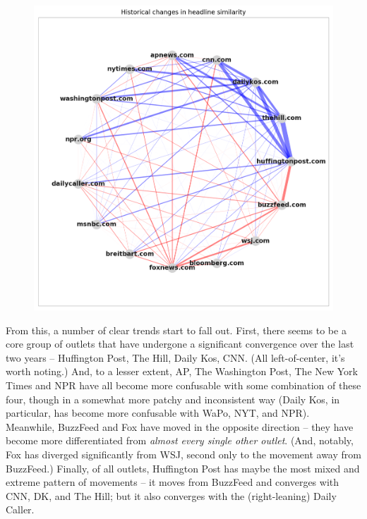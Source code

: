 \documentclass{scrartcl}
\begin{document}
\begin{figure}[H]
  \centering
  \includegraphics[height=0.5\textheight]{figures/ts-ab-radial.png}
\end{figure}

From this, a number of clear trends start to fall out. First, there seems to be a core group of outlets that have undergone a significant convergence over the last two years -- Huffington Post, The Hill, Daily Kos, CNN. (All left-of-center, it's worth noting.) And, to a lesser extent, AP, The Washington Post, The New York Times and NPR have all become more confusable with some combination of these four, though in a somewhat more patchy and inconsistent way (Daily Kos, in particular, has become more confusable with WaPo, NYT, and NPR). Meanwhile, BuzzFeed and Fox have moved in the opposite direction -- they have become more differentiated from \textit{almost every single other outlet}. (And, notably, Fox has diverged significantly from WSJ, second only to the movement away from BuzzFeed.) Finally, of all outlets, Huffington Post has maybe the most mixed and extreme pattern of movements -- it moves from BuzzFeed and converges with CNN, DK, and The Hill; but it also converges with the (right-leaning) Daily Caller.
\end{document}

